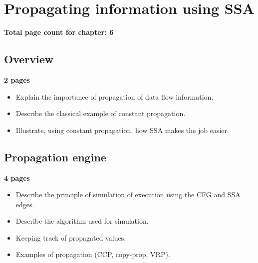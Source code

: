 \chapter{Propagating information using SSA}

\textbf{Total page count for chapter: 6}

\section{Overview}

\textbf{2 pages}

\begin{itemize}
\item	Explain the importance of propagation of data flow
	information.

\item	Describe the classical example of constant propagation.

\item	Illustrate, using constant propagation, how SSA makes
	the job easier.
\end{itemize}


\section{Propagation engine}

\textbf{4 pages}

\begin{itemize}
\item	Describe the principle of simulation of execution using
	the CFG and SSA edges.

\item	Describe the algorithm used for simulation.

\item	Keeping track of propagated values.

\item	Examples of propagation (CCP, copy-prop, VRP).
\end{itemize}
